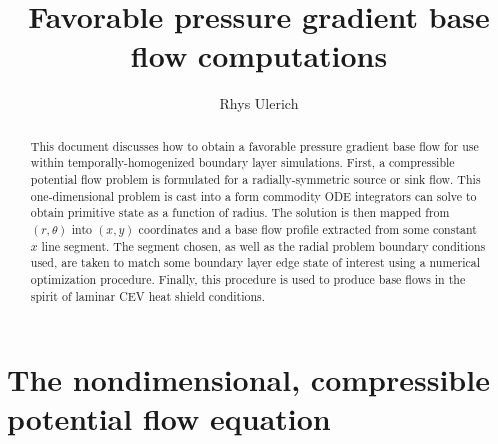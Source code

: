 \documentclass[letterpaper,11pt,nointlimits,reqno]{amsart}
\begin{document}
\title{Favorable pressure gradient base flow computations}
\author{Rhys Ulerich}

\begin{abstract}
This document discusses how to obtain a favorable pressure gradient base flow
for use within temporally-homogenized boundary layer simulations.  First, a
compressible potential flow problem is formulated for a radially-symmetric
source or sink flow.  This one-dimensional problem is cast into a form
commodity ODE integrators can solve to obtain primitive state as a function of
radius.  The solution is then mapped from $\left(r,\theta\right)$ into
$\left(x,y\right)$ coordinates and a base flow profile extracted from some constant
$x$ line segment.  The segment chosen, as well as the radial problem boundary
conditions used, are taken to match some boundary layer edge state of interest
using a numerical optimization procedure.  Finally, this procedure is used
to produce base flows in the spirit of laminar CEV heat shield conditions.
\end{abstract}

\maketitle

\tableofcontents

\section{The nondimensional, compressible potential flow equation}
\end{document}
